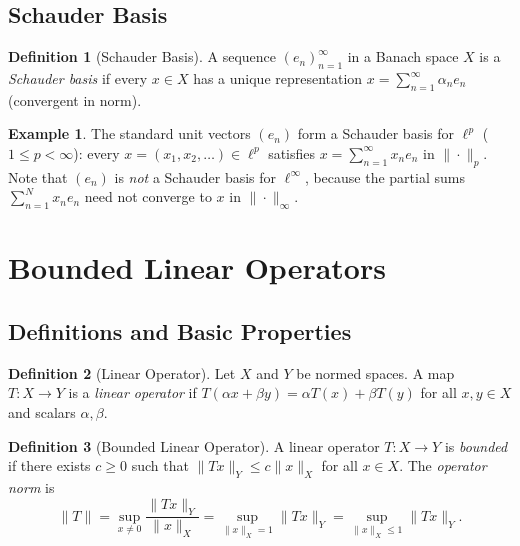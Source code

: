 \documentclass[11pt,a4paper]{article}
\theoremstyle{definition}
\newtheorem{definition}{Definition}[section]
\newtheorem{example}{Example}[section]
\theoremstyle{plain}
\theoremstyle{remark}
\begin{document}
\subsection{Schauder Basis}
\label{subsec:schauder}

\begin{definition}[Schauder Basis]
\label{def:schauder}
A sequence $(e_n)_{n=1}^\infty$ in a Banach space $X$ is a \emph{Schauder basis}
if every $x \in X$ has a unique representation $x = \sum_{n=1}^\infty \alpha_n e_n$
(convergent in norm).
\end{definition}

\begin{example}
The standard unit vectors $(e_n)$ form a Schauder basis for $\ell^p$ ($1 \le p < \infty$):
every $x = (x_1, x_2, \ldots) \in \ell^p$ satisfies
$x = \sum_{n=1}^\infty x_n e_n$ in $\|\cdot\|_p$.
Note that $(e_n)$ is \emph{not} a Schauder basis for $\ell^\infty$, because the
partial sums $\sum_{n=1}^N x_n e_n$ need not converge to $x$ in $\|\cdot\|_\infty$.
\end{example}

\section{Bounded Linear Operators}
\label{sec:operators}

\subsection{Definitions and Basic Properties}

\begin{definition}[Linear Operator]
\label{def:linear_op}
Let $X$ and $Y$ be normed spaces. A map $T \colon X \to Y$ is a \emph{linear
operator} if $T(\alpha x + \beta y) = \alpha T(x) + \beta T(y)$ for all
$x, y \in X$ and scalars $\alpha, \beta$.
\end{definition}

\begin{definition}[Bounded Linear Operator]
\label{def:bounded_op}
A linear operator $T \colon X \to Y$ is \emph{bounded} if there exists $c \ge 0$
such that $\|Tx\|_Y \le c \|x\|_X$ for all $x \in X$. The \emph{operator norm} is
\[
\|T\| = \sup_{x \ne 0} \frac{\|Tx\|_Y}{\|x\|_X} = \sup_{\|x\|_X = 1} \|Tx\|_Y
= \sup_{\|x\|_X \le 1} \|Tx\|_Y.
\]
\end{definition}
\end{document}
